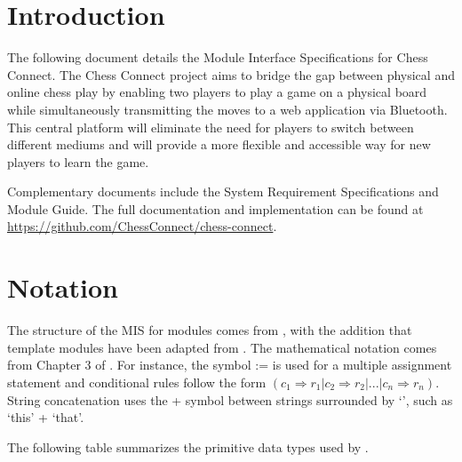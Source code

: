 \documentclass[12pt, titlepage]{article}
\begin{document}
\newpage

\tableofcontents

\newpage


\section{Introduction}

The following document details the Module Interface Specifications for
Chess Connect. The Chess Connect project aims to bridge the gap between physical and online chess play by enabling two players to play a game on a physical board while simultaneously transmitting the moves to a web application via Bluetooth. This central platform will eliminate the need for players to switch between different mediums and will provide a more flexible and accessible way for new players to learn the game.

Complementary documents include the System Requirement Specifications
and Module Guide.  The full documentation and implementation can be
found at \url{https://github.com/ChessConnect/chess-connect}.

\section{Notation}

The structure of the MIS for modules comes from \citet{HoffmanAndStrooper1995},
with the addition that template modules have been adapted from
\cite{GhezziEtAl2003}.  The mathematical notation comes from Chapter 3 of
\citet{HoffmanAndStrooper1995}.  For instance, the symbol := is used for a
multiple assignment statement and conditional rules follow the form $(c_1
\Rightarrow r_1 | c_2 \Rightarrow r_2 | ... | c_n \Rightarrow r_n )$. 
String concatenation uses the + symbol between strings surrounded by `', 
such as `this' + `that'.

The following table summarizes the primitive data types used by \progname. 
\end{document}
